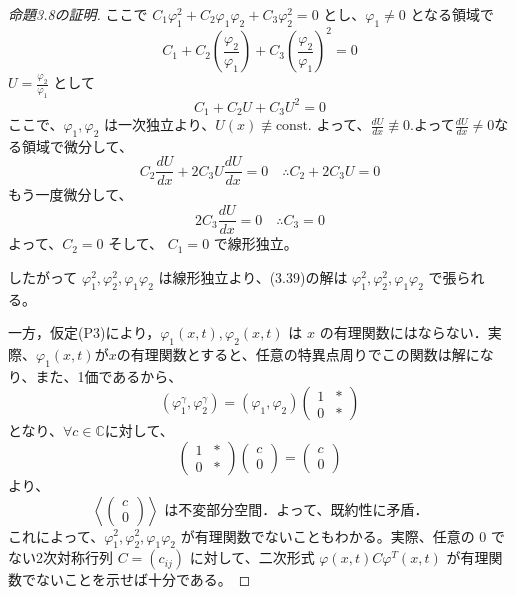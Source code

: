 \begin{story}
\begin{proof}[命題3.8の証明]
ここで $C_1\varphi_1^2 + C_2\varphi_1\varphi_2 + C_3\varphi_2^2 = 0$ とし、$\varphi_1 \neq 0$ となる領域で
\begin{equation*}
    C_1 + C_2\left(\frac{\varphi_2}{\varphi_1}\right) + C_3\left(\frac{\varphi_2}{\varphi_1}\right)^2 = 0
\end{equation*}
$U = \frac{\varphi_2}{\varphi_1}$ として 
\[
C_1 + C_2U + C_3U^2 = 0
\]
ここで、$\varphi_1, \varphi_2$ は一次独立より、$U(x) \not\equiv \text{const.}$ よって、$\frac{dU}{dx} \not\equiv 0$.よって$\frac{dU}{dx} \neq 0$なる領域で微分して、
\begin{equation*}
    C_2\frac{dU}{dx} + 2C_3U\frac{dU}{dx} = 0 \quad \therefore C_2 + 2C_3U = 0
\end{equation*}
もう一度微分して、
\begin{equation*}
    2C_3 \frac{dU}{dx} = 0 \quad \therefore C_3 = 0
\end{equation*}
よって、$C_2 = 0$ そして、 $C_1 = 0$ で線形独立。

したがって $\varphi_1^2, \varphi_2^2, \varphi_1\varphi_2$ は線形独立より、(3.39)の解は $\varphi_1^2, \varphi_2^2, \varphi_1\varphi_2$ で張られる。

一方，仮定(P3)により，$\varphi_1(x,t), \varphi_2(x,t)$ は $x$ の有理関数にはならない．実際、$\varphi_{1}(x,t)$が$x$の有理関数とすると、任意の特異点周りでこの関数は解になり、また、1価であるから、
\begin{equation*}
    (\varphi_1^\gamma, \varphi_2^\gamma) = (\varphi_1, \varphi_2) 
    \begin{pmatrix}
        1 & * \\
        0 & *
    \end{pmatrix}
\end{equation*}
となり、$\forall c\in\mathbb{C}$に対して、
\begin{equation*}
    \begin{pmatrix}
        1 & * \\
        0 & *
    \end{pmatrix}
    \begin{pmatrix}
        c \\
        0
    \end{pmatrix}
    =
    \begin{pmatrix}
        c \\
        0
    \end{pmatrix}
\end{equation*}
より、
\begin{equation*}
    \left\langle \begin{pmatrix} c \\ 0 \end{pmatrix} \right\rangle \text{ は不変部分空間．よって、既約性に矛盾．}
\end{equation*}
これによって、$\varphi_1^2, \varphi_2^2, \varphi_1\varphi_2$ が有理関数でないこともわかる。実際、任意の $0$ でない2次対称行列 $C=(c_{ij})$ に対して、二次形式 $\varphi(x,t) C \varphi^{T}(x,t)$ が有理関数でないことを示せば十分である。


\end{proof}
\end{story}
